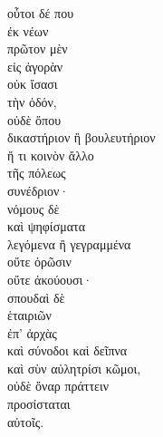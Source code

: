{\large
\begin{greek}
\noindent οὗτοι δέ που \\
\tabto{2em} ἐκ νέων \\
πρῶτον μὲν \\
\tabto{2em} εἰς ἀγορὰν \\
οὐκ ἴσασι \\
\tabto{2em} τὴν ὁδόν, \\
οὐδὲ ὅπου \\
\tabto{2em} δικαστήριον ἢ βουλευτήριον \\
\tabto{2em} ἤ τι κοινὸν ἄλλο \\
\tabto{4em} τῆς πόλεως \\
\tabto{2em} συνέδριον· \\
νόμους δὲ \\
καὶ ψηφίσματα \\
\tabto{4em} λεγόμενα ἢ γεγραμμένα \\
\tabto{2em} οὔτε ὁρῶσιν \\
\tabto{2em} οὔτε ἀκούουσι· \\

\noindent σπουδαὶ δὲ \\
\tabto{2em} ἑταιριῶν \\
\tabto{4em} ἐπ' ἀρχὰς \\
καὶ σύνοδοι καὶ δεῖπνα \\
καὶ σὺν αὐλητρίσι κῶμοι, \\
οὐδὲ ὄναρ πράττειν \\
\tabto{2em} προσίσταται \\
\tabto{4em} αὐτοῖς.\\

\end{greek}
}

